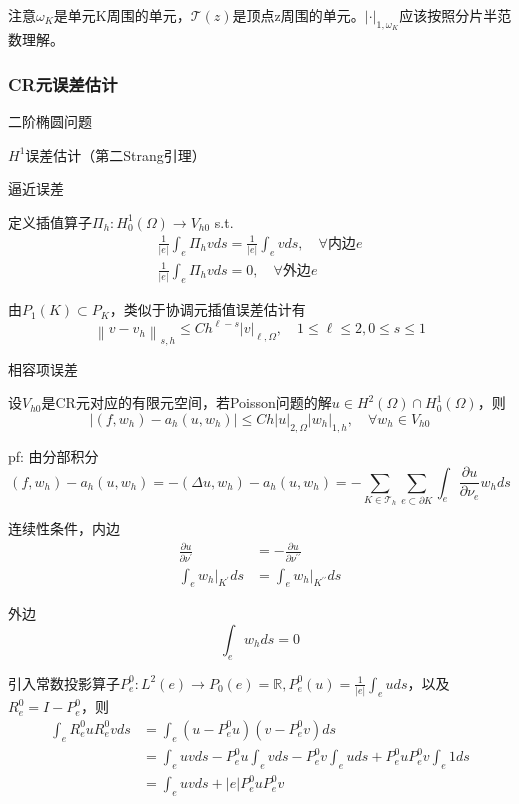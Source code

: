 注意$\omega_K$是单元K周围的单元，$\mathcal{T}(z)$是顶点z周围的单元。$|\cdot|_{1, \omega_K}$应该按照分片半范数理解。

\subsubsection{CR元误差估计}

二阶椭圆问题

$H^1$误差估计（第二Strang引理）

逼近误差

定义插值算子$\Pi_{h}: H_{0}^{1}(\Omega) \rightarrow V_{h 0}$ s.t.
\[
  \begin{aligned}
    \frac{1}{|e|} \int_{e} \Pi_{h} v ds=\frac{1}{|e|} \int_{e} v ds, \quad \forall \text{内边} e \\
    \frac{1}{|e|} \int_{e} \Pi_{h} v ds=0, \quad \forall \text{外边} e
  \end{aligned}
\]
 
由$P_{1}(K) \subset P_{K}$，类似于协调元插值误差估计有
\[
  \left\|v-v_{h}\right\|_{s, h} \le C h^{\ell-s}|v|_{\ell, \Omega}, \quad 1 \le \ell \le 2,0 \le s \le 1
\]

相容项误差

设$V_{h 0}$是CR元对应的有限元空间，若Poisson问题的解$u \in H^{2}(\Omega) \cap H_{0}^{1}(\Omega)$，则
\[
  \left|\left(f, w_{h}\right)-a_{h}\left(u, w_{h}\right)\right| \le C h|u|_{2, \Omega}\left|w_{h}\right|_{1, h}, \quad \forall w_{h} \in V_{h 0}
\]

pf: 由分部积分
\[
  \left(f, w_{h}\right)-a_{h}\left(u, w_{h}\right)=-\left(\Delta u, w_{h}\right)-a_{h}\left(u, w_{h}\right)=-\sum_{K \in \mathcal{T}_{h}} \sum_{e \subset \partial K} \int_{e} \frac{\partial u}{\partial \nu_{e}} w_{h} ds
\]

连续性条件，内边
\[
  \begin{aligned}
    \frac{\partial u}{\partial \nu^{\prime}} & =-\frac{\partial u}{\partial \nu^{\prime \prime}} \\
    \int_{e} w_{h}|_{K^{\prime}} ds & =\int_{e} w_{h}|_{K^{\prime \prime}} ds
  \end{aligned}
\]

外边
\[
  \int_{e} w_{h} ds=0
\]

引入常数投影算子$P_e^0: L^2(e) \to P_0(e) = \mathbb{R}, P_e^0(u) = \frac{1}{|e|}\int_e u ds$，以及$R_e^0 = I - P_e^0$，则
\[
  \begin{aligned}
    \int_{e} R_e^0 u R_e^0 v ds &= \int_{e} (u - P_e^0 u) (v - P_e^0 v) ds\\
    &= \int_{e} u v ds - P_e^0 u \int_{e} v ds - P_e^0 v \int_{e} u ds + P_e^0 u P_e^0 v \int_{e} 1 ds\\
    &= \int_{e} u v ds + |e| P_e^0 u P_e^0 v
  \end{aligned}
\]

